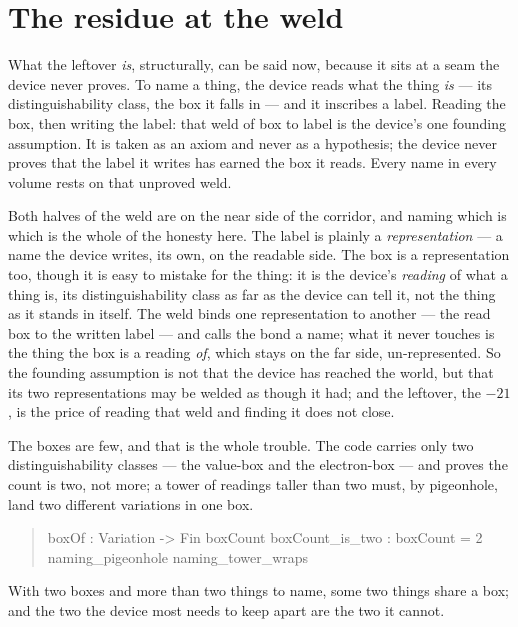 \section{The residue at the weld}

What the leftover \emph{is}, structurally, can be said now, because it sits at a seam the device never proves.
To name a thing, the device reads what the thing \emph{is} --- its distinguishability class, the box it falls in ---
and it inscribes a label.
Reading the box, then writing the label: that weld of box to label is the device's one founding assumption.
It is taken as an axiom and never as a hypothesis; the device never proves that the label it writes has earned the box
it reads.
Every name in every volume rests on that unproved weld.

Both halves of the weld are on the near side of the corridor, and naming which is which is the whole of the honesty here.
The label is plainly a \emph{representation} --- a name the device writes, its own, on the readable side.
The box is a representation too, though it is easy to mistake for the thing: it is the device's \emph{reading} of what a
thing is, its distinguishability class as far as the device can tell it, not the thing as it stands in itself.
The weld binds one representation to another --- the read box to the written label --- and calls the bond a name; what it
never touches is the thing the box is a reading \emph{of}, which stays on the far side, un-represented.
So the founding assumption is not that the device has reached the world, but that its two representations may be welded as
though it had; and the leftover, the $-21$, is the price of reading that weld and finding it does not close.

The boxes are few, and that is the whole trouble.
The code carries only two distinguishability classes --- the value-box and the electron-box --- and proves the count is
two, not more; a tower of readings taller than two must, by pigeonhole, land two different variations in one box.
\begin{quote}\ttfamily
boxOf : Variation -> Fin boxCount \qquad boxCount\_is\_two : boxCount = 2\\
naming\_pigeonhole \quad naming\_tower\_wraps
\end{quote}
With two boxes and more than two things to name, some two things share a box; and the two the device most needs to keep
apart are the two it cannot.

